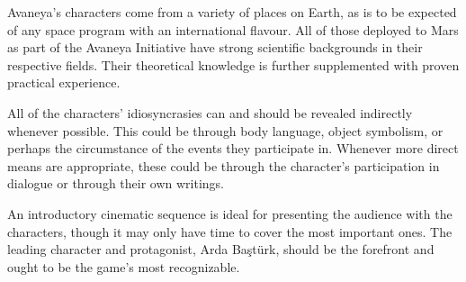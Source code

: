 

Avaneya's characters come from a variety of places on Earth, as is to be expected of any space program with an international flavour. All of those deployed to Mars as part of the Avaneya Initiative have strong scientific backgrounds in their respective fields. Their theoretical knowledge is further supplemented with proven practical experience.

All of the characters' idiosyncrasies can and should be revealed indirectly whenever possible. This could be through body language, object symbolism, or perhaps the circumstance of the events they participate in. Whenever more direct means are appropriate, these could be through the character's participation in dialogue or through their own writings.

An introductory cinematic sequence is ideal for presenting the audience with the characters, though it may only have time to cover the most important ones. The leading character and protagonist, Arda Baştürk, should be the forefront and ought to be the game's most recognizable.


%
%

\StopChapter

